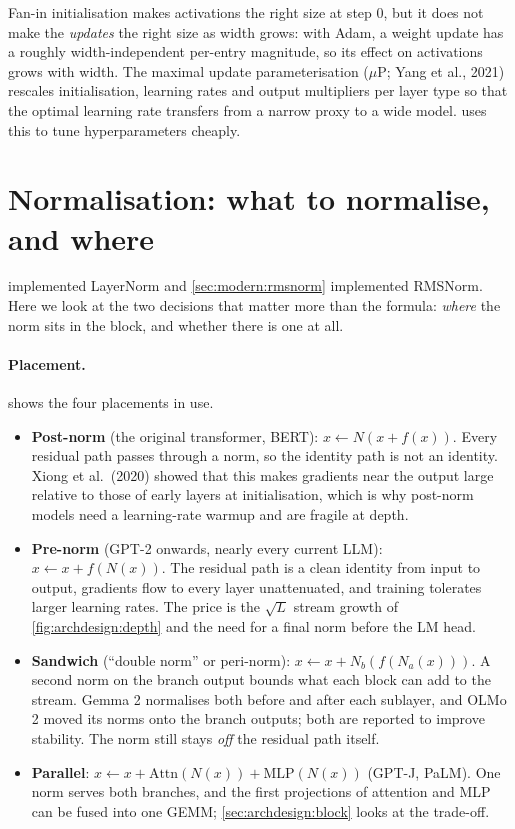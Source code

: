 \begin{deepdive}
Fan-in initialisation makes activations the right size at step 0, but it does not make the
\emph{updates} the right size as width grows: with Adam, a weight update has a roughly
width-independent per-entry magnitude, so its effect on activations grows with width. The maximal
update parameterisation ($\mu$P; Yang et al., 2021) rescales initialisation, learning rates and
output multipliers per layer type so that the optimal learning rate transfers from a narrow proxy to
a wide model.  uses this to tune hyperparameters cheaply.
\end{deepdive}

\section{Normalisation: what to normalise, and where}\label{sec:archdesign:norm}

 implemented LayerNorm and \cref{sec:modern:rmsnorm} implemented RMSNorm. Here we
look at the two decisions that matter more than the formula: \emph{where} the norm sits in the
block, and whether there is one at all.

\paragraph{Placement.}  shows the four placements in use.
\begin{itemize}
\item \textbf{Post-norm} (the original transformer, BERT): $x\leftarrow N(x+f(x))$. Every
  residual path passes through a norm, so the identity path is not an identity. Xiong et
  al.~(2020) showed that this makes gradients near the output large relative to those of early layers
  at initialisation, which is why post-norm models need a learning-rate warmup and are fragile at
  depth.
\item \textbf{Pre-norm} (GPT-2 onwards, nearly every current LLM): $x\leftarrow x+f(N(x))$. The
  residual path is a clean identity from input to output, gradients flow to every layer unattenuated,
  and training tolerates larger learning rates. The price is the $\sqrt{L}$ stream growth of
  \cref{fig:archdesign:depth} and the need for a final norm before the LM head.
\item \textbf{Sandwich} (``double norm'' or peri-norm): $x\leftarrow x+N_b(f(N_a(x)))$. A second norm
  on the branch output bounds what each block can add to the stream. Gemma 2 normalises both
  before and after each sublayer, and OLMo 2 moved its norms onto the branch outputs; both are
  reported to improve stability. The norm still stays \emph{off} the residual path itself.
\item \textbf{Parallel}: $x\leftarrow x+\mathrm{Attn}(N(x))+\mathrm{MLP}(N(x))$ (GPT-J, PaLM). One
  norm serves both branches, and the first projections of attention and MLP can be fused into one
  GEMM; \cref{sec:archdesign:block} looks at the trade-off.
\end{itemize}

